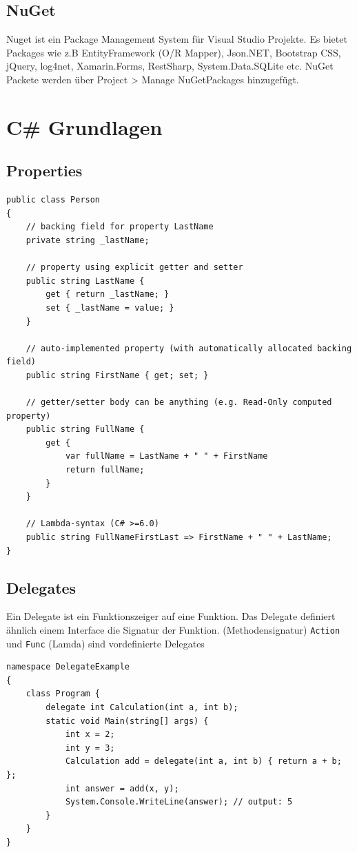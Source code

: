 \subsection{NuGet}
Nuget ist ein Package Management System für Visual Studio Projekte. Es bietet Packages wie z.B EntityFramework (O/R Mapper), Json.NET, Bootstrap CSS, jQuery, log4net, Xamarin.Forms, RestSharp, System.Data.SQLite etc. NuGet Packete werden über Project > Manage NuGetPackages hinzugefügt.


\section{C\# Grundlagen}
\subsection{Properties}
\begin{lstlisting}[caption=C\# Properties]
public class Person
{
	// backing field for property LastName
	private string _lastName;

	// property using explicit getter and setter
	public string LastName {
		get { return _lastName; }
		set { _lastName = value; }
	}
	
	// auto-implemented property (with automatically allocated backing field)
	public string FirstName { get; set; }

	// getter/setter body can be anything (e.g. Read-Only computed property)
	public string FullName {
		get {
			var fullName = LastName + " " + FirstName
			return fullName;
		}
	}

	// Lambda-syntax (C# >=6.0)
	public string FullNameFirstLast => FirstName + " " + LastName;
}
\end{lstlisting}


\subsection{Delegates}
Ein Delegate ist ein Funktionszeiger auf eine Funktion. Das Delegate definiert ähnlich einem Interface die Signatur der Funktion. (Methodensignatur) \lstinline[]|Action| und \lstinline[]|Func| (Lamda) sind vordefinierte Delegates
\begin{lstlisting}[caption=C\# Delegates]
namespace DelegateExample
{
	class Program {
		delegate int Calculation(int a, int b);
		static void Main(string[] args) {
			int x = 2;
			int y = 3;
			Calculation add = delegate(int a, int b) { return a + b; };
			int answer = add(x, y);
			System.Console.WriteLine(answer); // output: 5
		}
	}
}
\end{lstlisting}

